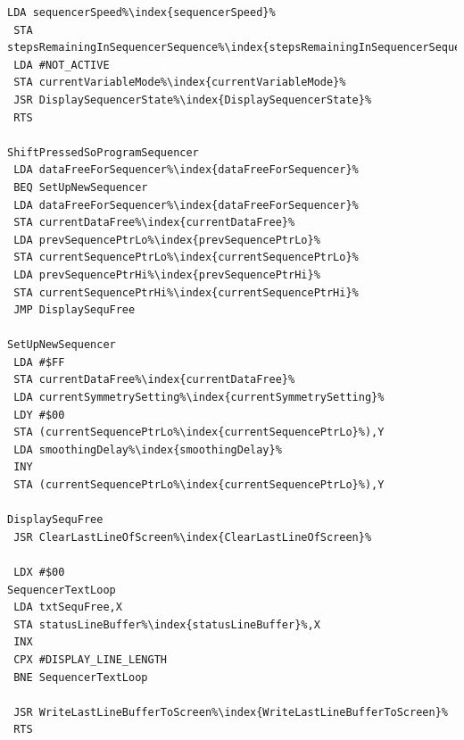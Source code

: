 \begin{minipage}[b]{0.33\linewidth}
\begin{lrbox}{\mybox}
\begin{lstlisting}[basicstyle=\ttfamily\tiny,escapechar=\%]
 LDA sequencerSpeed%\index{sequencerSpeed}%
 STA stepsRemainingInSequencerSequence%\index{stepsRemainingInSequencerSequence}%
 LDA #NOT_ACTIVE
 STA currentVariableMode%\index{currentVariableMode}%
 JSR DisplaySequencerState%\index{DisplaySequencerState}%
 RTS

ShiftPressedSoProgramSequencer
 LDA dataFreeForSequencer%\index{dataFreeForSequencer}%
 BEQ SetUpNewSequencer
 LDA dataFreeForSequencer%\index{dataFreeForSequencer}%
 STA currentDataFree%\index{currentDataFree}%
 LDA prevSequencePtrLo%\index{prevSequencePtrLo}%
 STA currentSequencePtrLo%\index{currentSequencePtrLo}%
 LDA prevSequencePtrHi%\index{prevSequencePtrHi}%
 STA currentSequencePtrHi%\index{currentSequencePtrHi}%
 JMP DisplaySequFree

SetUpNewSequencer
 LDA #$FF
 STA currentDataFree%\index{currentDataFree}%
 LDA currentSymmetrySetting%\index{currentSymmetrySetting}%
 LDY #$00
 STA (currentSequencePtrLo%\index{currentSequencePtrLo}%),Y
 LDA smoothingDelay%\index{smoothingDelay}%
 INY
 STA (currentSequencePtrLo%\index{currentSequencePtrLo}%),Y

DisplaySequFree
 JSR ClearLastLineOfScreen%\index{ClearLastLineOfScreen}%

 LDX #$00
SequencerTextLoop
 LDA txtSequFree,X
 STA statusLineBuffer%\index{statusLineBuffer}%,X
 INX
 CPX #DISPLAY_LINE_LENGTH
 BNE SequencerTextLoop

 JSR WriteLastLineBufferToScreen%\index{WriteLastLineBufferToScreen}%
 RTS
\end{lstlisting}
\end{lrbox}%
\scalebox{0.8}{\usebox{\mybox}}
\end{minipage}

